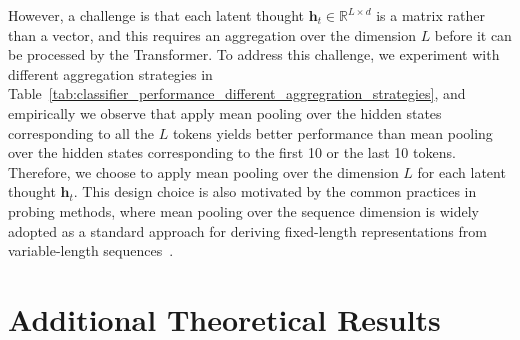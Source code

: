 \documentclass{article} %
\begin{document}
However, a challenge is that each latent thought $\mathbf{h}_t \in \mathbb{R}^{L \times d}$ is a matrix rather than a vector, and this requires an aggregation over the dimension $L$ before it can be processed by the Transformer. 
%
To address this challenge, we experiment with different aggregation strategies in Table~\ref{tab:classifier_performance_different_aggregration_strategies}, and empirically we observe that apply mean pooling over the hidden states corresponding to all the $L$ tokens yields better performance than mean pooling over the hidden states corresponding to the first 10 or the last 10 tokens. Therefore, we choose to apply mean pooling over the dimension $L$ for each latent thought $\mathbf{h}_t$. This design choice is also motivated by the common practices in probing methods, where mean pooling over the sequence dimension is widely adopted as a standard approach for deriving fixed-length representations from variable-length sequences~\citep{hewitt2019structural,tenney2019bert,ren2023outofdistribution}. 

\section{Additional Theoretical Results}\label{appendix:thm_results}
\end{document}
